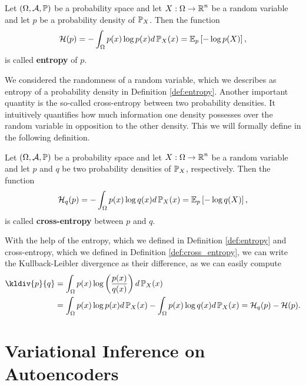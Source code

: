 \begin{definition}\label{def:entropy}
Let $(\Omega,\operatorname{\mathcal{A}}, \operatorname{\mathbb{P}})$ be a probability space and let $X:\Omega \to \operatorname{\mathbb{R}}^n$ be a random variable and let $p$ be a probability density of $\operatorname{\mathbb{P}}_X$. Then the function
\begin{align}
\mathcal{H}(p) = -\int_{\Omega} p(x) \log p(x)d\operatorname{\mathbb{P}}_X(x) = \operatorname{\mathbb{E}}_p \left[ - \log p(X) \right],
\end{align}
is called \textbf{entropy} of $p$.
\end{definition}

We considered the \glqq randomness\grqq{} of a random variable, which we describes as entropy of a probability density in Definition \ref{def:entropy}. Another important quantity is the so-called cross-entropy between two probability densities. It intuitively quantifies how much information one density possesses over the random variable in opposition to the other density. This we will formally define in the following definition.

\begin{definition}\label{def:cross_entropy}
Let $(\Omega,\operatorname{\mathcal{A}}, \operatorname{\mathbb{P}})$ be a probability space and let $X:\Omega \to \operatorname{\mathbb{R}}^n$ be a random variable and let $p$ and $q$ be two probability densities of $\operatorname{\mathbb{P}}_X$, respectively. Then the function
\begin{align}
\mathcal{H}_q(p) = -\int_{\Omega} p(x) \log q(x)d\operatorname{\mathbb{P}}_X(x) = \operatorname{\mathbb{E}}_p \left[ - \log q(X) \right],
\end{align}
is called \textbf{cross-entropy} between $p$ and $q$.
\end{definition}

With the help of the entropy, which we defined in Definition \ref{def:entropy} and cross-entropy, which we defined in Definition \ref{def:cross_entropy}, we can write the Kullback-Leibler divergence as their difference, as we can easily compute
\begin{align}\label{eq:kl_entropy}
\kldiv{p}{q} &= \int_\O p(x) \log \left( \frac{p(x)}{q(x)}\right) d\prob_X(x)\nonumber\\
 &=\int_\O p(x) \log p(x) d\prob_X(x) - \int_\O p(x) \log  q(x) d\prob_X(x) = \H_q(p) - \H(p).
\end{align}


\section{Variational Inference on Autoencoders}\label{sec:vi_on_ae}

